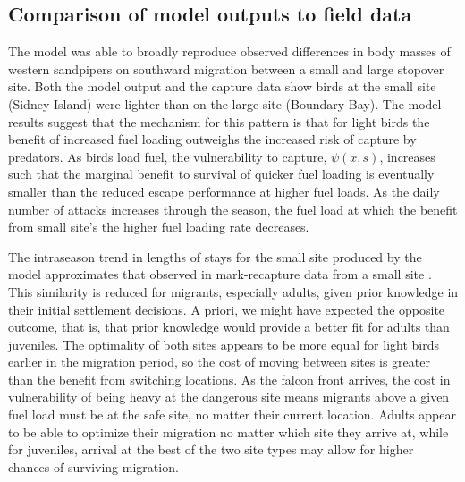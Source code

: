 \subsection*{Comparison of model outputs to field data}

The model was able to broadly reproduce observed differences in body masses of western sandpipers on southward migration between a small and large stopover site. Both the model output and the capture data show birds at the small site (Sidney Island) were lighter than on the large site (Boundary Bay). The model results suggest that the mechanism for this pattern is that for light birds the benefit of increased fuel loading outweighs the increased risk of capture by predators. As birds load fuel, the vulnerability to capture, $\psi(x,s)$, increases such that the marginal benefit to survival of quicker fuel loading is eventually smaller than the reduced escape performance at higher fuel loads. As the daily number of attacks increases through the season, the fuel load at which the benefit from small site's the higher fuel loading rate decreases. %

The intraseason trend in lengths of stays for the small site produced by the model approximates that observed in mark-recapture data from a small site \citep{Hope2011}. This similarity is reduced for migrants, especially adults, given prior knowledge in their initial settlement decisions. A priori, we might have expected the opposite outcome, that is, that prior knowledge would provide a better fit for adults than juveniles. The optimality of both sites appears to be more equal for light birds earlier in the migration period, so the cost of moving between sites is greater than the benefit from switching locations. As the falcon front arrives, the cost in vulnerability of being heavy at the dangerous site means migrants above a given fuel load must be at the safe site, no matter their current location. Adults appear to be able to optimize their migration no matter which site they arrive at, while for juveniles, arrival at the best of the two site types may allow for higher chances of surviving migration.


